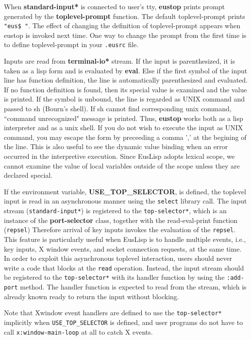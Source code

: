 When {\bf *standard-input*} is connected to user's tty,
{\bf eustop} prints prompt generated by the {\bf toplevel-prompt} function.
The default toplevel-prompt prints {\tt "eus\$ "}.
The effect of changing the definition of toplevel-prompt appears
when eustop is invoked next time.
One way to change the prompt from the first time is to define
toplevel-prompt in your {\tt .eusrc} file.

Inputs are read from {\bf *terminal-io*} stream.
If the input is parenthesized, it is taken as a lisp form and
is evaluated by {\bf eval}.
Else if the first symbol of the input line has function definition,
the line is automatically parenthesized and evaluated.
If no function definition is found,
then its special value is examined and the value is printed.
If the symbol is unbound,
the line is regarded as UNIX command and passed to sh (Bourn's shell).
If sh cannot find corresponding unix command,
``command unrecognized" message is printed.
Thus, {\bf eustop} works both as a lisp interpreter and as a unix shell.
If you do not wish to execute the input as UNIX command,
you may escape the form by preceeding a comma ',' at the begining of the line.
This is also useful to see the dynamic value binding when
an error occurred in the interpretive execution.
Since EusLisp adopts lexical scope,
we cannot examine the value of local variables outside of the scope
unless they are declared special.

If the environment variable, {\bf USE\_TOP\_SELECTOR}, is defined,
the toplevel input is read in an asynchronous manner using the {\tt select} 
library call.
The input stream ({\tt *standard-input*}) is registered to
the {\tt *top-selector*},
which is an instance of the {\bf port-selector} class,
together with the read-eval-print function ({\tt repsel})
Therefore arrival of key inputs invokes the evaluation of the {\tt repsel}.
This feature is particularly useful when EusLisp is to handle
multiple events, i.e., key inputs, X window events, and socket connection
requests, at the same time.
In order to exploit this asynchronous toplevel interaction,
users should never write a code that blocks  at  the {\tt read} operation.
Instead, the input stream should be registered to the {\tt *top-selector*}
with its handler function by using the {\tt :add-port} method.
The handler function is expected to read from the stream,
which is already known ready to return the input without blocking.

Note that Xwindow event handlers are defined to use the {\tt *top-selector*}
implicitly when {\tt USE\_TOP\_SELECTOR} is defined, and user programs do not
have to call {\tt x:window-main-loop} at all to catch X events.

